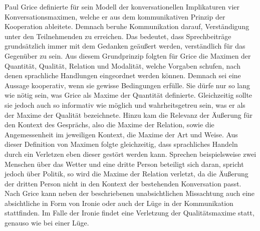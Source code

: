 Paul Grice definierte für sein Modell der konversationellen Implikaturen vier Konversationsmaximen, welche er aus dem kommunikativen Prinzip der Kooperation ableitete.
Demnach beruhe Kommunikation darauf, Verständigung unter den Teilnehmenden zu erreichen\cite[S. 220]{AL04}.
Das bedeutet, dass Sprechbeiträge grundsätzlich immer mit dem Gedanken geäußert werden, verständlich für das Gegenüber zu sein.
Aus diesem Grundprinzip folgten für Grice die Maximen der Quantität, Qualität, Relation und Modalität, welche Vorgaben schufen, nach denen sprachliche Handlungen eingeordnet werden können.
Demnach sei eine Aussage kooperativ, wenn sie gewisse Bedingungen erfülle.
Sie dürfe nur so lang wie nötig sein, was Grice als Maxime der Quantität definierte.
Gleichzeitig sollte sie jedoch auch so informativ wie möglich und wahrheitsgetreu sein, was er als der Maxime der Qualität bezeichnete.
Hinzu kam die Relevanz der Äußerung für den Kontext des Gesprächs, also die Maxime der Relation, sowie die Angemessenheit im jeweiligen Kontext, die Maxime der Art und Weise.
Aus dieser Definition von Maximen folgte gleichzeitig, dass sprachliches Handeln durch ein Verletzen eben dieser gestört werden kann.
Sprechen beispielsweise zwei Menschen über das Wetter und eine dritte Person beteiligt sich daran, spricht jedoch über Politik, so wird die Maxime der Relation verletzt, da die Äußerung der dritten Person nicht in den Kontext der bestehenden Konversation passt.
Nach Grice kann neben der beschriebenen unabsichtlichen Missachtung auch eine absichtliche in Form von Ironie oder auch der Lüge in der Kommunikation stattfinden.
Im Falle der Ironie findet eine Verletzung der Qualitätsmaxime statt\cite[S. 97]{PA99}, genauso wie bei einer Lüge\cite[S. 96]{PA99}.

